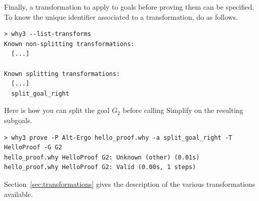Finally, a transformation to apply to goals before proving them can be
specified. To know the unique identifier associated to
a transformation, do as follows.
\begin{verbatim}
> why3 --list-transforms
Known non-splitting transformations:
  [...]

Known splitting transformations:
  [...]
  split_goal_right
\end{verbatim}
Here is how you can split the goal $G_2$ before calling
Simplify on the resulting subgoals.
\begin{verbatim}
> why3 prove -P Alt-Ergo hello_proof.why -a split_goal_right -T HelloProof -G G2
hello_proof.why HelloProof G2: Unknown (other) (0.01s)
hello_proof.why HelloProof G2: Valid (0.00s, 1 steps)
\end{verbatim}
Section~\ref{sec:transformations} gives the description of the various
transformations available.


